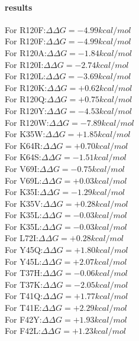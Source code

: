 \documentclass{article}
\begin{document}
\paragraph{results}
For R120F:$\Delta\Delta G=-4.99 kcal/mol$
\\
For R120F:$\Delta\Delta G=-4.99 kcal/mol$
\\
For R120A:$\Delta\Delta G=-1.84 kcal/mol$
\\
For R120I:$\Delta\Delta G=-2.74 kcal/mol$
\\
For R120L:$\Delta\Delta G=-3.69 kcal/mol$
\\
For R120K:$\Delta\Delta G=+0.62 kcal/mol$
\\
For R120Q:$\Delta\Delta G=+0.75 kcal/mol$
\\
For R120Y:$\Delta\Delta G=-4.53 kcal/mol$
\\
For R120W:$\Delta\Delta G=-7.89 kcal/mol$
\\
For K35W:$\Delta\Delta G=+1.85 kcal/mol$
\\
For K64R:$\Delta\Delta G=+0.70 kcal/mol$
\\
For K64S:$\Delta\Delta G=-1.51 kcal/mol$
\\
For V69I:$\Delta\Delta G=-0.75 kcal/mol$
\\
For V69L:$\Delta\Delta G=+0.03 kcal/mol$
\\
For K35I:$\Delta\Delta G=-1.29 kcal/mol$
\\
For K35V:$\Delta\Delta G=+0.28 kcal/mol$
\\
For K35L:$\Delta\Delta G=-0.03 kcal/mol$
\\
For K35L:$\Delta\Delta G=-0.03 kcal/mol$
\\
For L72I:$\Delta\Delta G=+0.28 kcal/mol$
\\
For Y45Q:$\Delta\Delta G=+1.80 kcal/mol$
\\
For Y45L:$\Delta\Delta G=+2.07 kcal/mol$
\\
For T37H:$\Delta\Delta G=-0.06 kcal/mol$
\\
For T37K:$\Delta\Delta G=-2.05 kcal/mol$
\\
For T41Q:$\Delta\Delta G=+1.77 kcal/mol$
\\
For T41E:$\Delta\Delta G=+2.29 kcal/mol$
\\
For F42Y:$\Delta\Delta G=+1.93 kcal/mol$
\\
For F42L:$\Delta\Delta G=+1.23 kcal/mol$
\\
\end{document}
